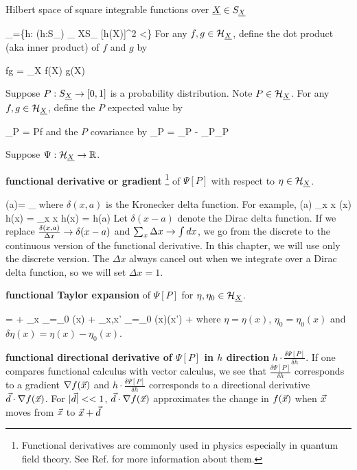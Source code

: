 Hilbert space of square integrable functions over ${\underline{X}}\in S_{\underline{X}}$

\beq
\calh_\rvX =\{h: (h:S_\rvX\rarrow \RR) 
\sum_{ X\in S_ \rvX}[h(X)]^2 <\infty\}
\eeq
For any $f,g\in {\cal H}_{\underline{X}}$,
define the dot product (aka inner product)
of $f$ and $g$ by

\beq
f\cdot g = \sum_X f(X) g(X)
\eeq


Suppose $P:S_{\underline{X}}\rightarrow [0,1]$
is a probability distribution.
Note $P\in{\cal H}_{\underline{X}}$.
For any $f,g\in{\cal H}_{\underline{X}}$,
define the $P$ expected value by

\beq
{}_P = P\cdot f
\eeq
and the $P$ covariance by
\beq
{}_P =
_P - _P_P
\eeq

Suppose $\Psi:{\cal H}_{\underline{X}}\rightarrow { \mathbb{R}}$.

{\bf functional derivative or gradient }\footnote{
Functional derivatives are commonly used in physics
especially in quantum field theory.
See Ref.\cite{wiki-func-deri} for more
information about them.}
of $\Psi[P]$ with respect to $\eta\in{\cal H}_{\underline{X}}$.


\beq
\frac{\delta \Psi[\eta]}
{\delta \eta(a)}=
\lim_{\eps{}}
{\eps}
\eeq
where $\delta(x,a)$ is the Kronecker delta function.
For example,
\beq
\frac{\delta}
{\delta \eta(a)}
\sum_x \Delta x\; \eta(x) h(x)
=
\sum_x \Delta x  h(x)
=
h(a)
\eeq
 Let
$\delta(x-a)$ denote the Dirac delta function. If we replace
$\frac{\delta(x,a)}{\Delta x}\rightarrow\delta(x-a)$
and $\sum_x \Delta x\rightarrow \int dx$, we go
from the discrete to the continuous version
of the functional derivative.
In this chapter, we will use only the discrete version.
The $\Delta x$ always cancel out
when we integrate over a Dirac delta function, so we will set
$\Delta x=1$.

{\bf functional Taylor expansion} of $\Psi[P]$
for $\eta, \eta_0\in {\cal H}_{\underline{X}}$.

\beq
\Psi[\eta]=
\Psi[\eta_0]
+ \sum_x
_{\eta=\eta_0}
\delta\eta(x)
+
\sum_{x,x'}
_{\eta=\eta_0}
\delta\eta(x)\delta\eta(x')
+
\cdots
\eeq
where
$ \eta =\eta(x)$,
$\eta_0=\eta_0(x)$ and $\delta \eta(x) = \eta(x)-\eta_0(x)$.



{\bf functional directional derivative of $\Psi[P]$ in $h$ direction}
$h\cdot\frac{\delta \Psi[P]}{\delta h}$.
If one compares functional calculus with vector calculus, we see that
$\frac{\delta \Psi[P]}{\delta h}$ corresponds to a gradient
$\nabla f({\vec{x}})$ and
$h\cdot \frac{\delta \Psi[P]}{\delta h}$
corresponds to a directional derivative
${\vec{d}}\cdot \nabla f({\vec{x}})$.
For $|{\vec{d}}|<<1$, ${\vec{d}}\cdot \nabla f({\vec{x}})$ approximates
the change
in $f({\vec{x}})$ when ${\vec{x}}$ moves from ${\vec{x}}$ to ${\vec{x}}+{\vec{d}}$

